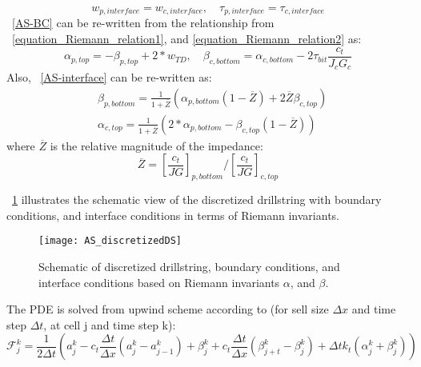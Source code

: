 \begin{equation}\label{AS-interface}
  w_{p,interface} = w_{c,interface}, \quad \tau_{p,interface} = \tau_{c,interface}
\end{equation}
\equationname~\ref{AS-BC} can be re-written from the relationship from \equationname~\ref{equation_Riemann_relation1}, and \ref{equation_Riemann_relation2} as:
\begin{equation}\label{AS-riemannBC}
  \alpha_{p,top} = -\beta_{p,top} + 2*w_{TD}, \quad \beta_{c,bottom} = \alpha_{c,bottom} - 2\tau_{bit} \frac{c_t}{J_c G_c}
\end{equation}
Also, \equationname~\ref{AS-interface} can be re-written as:
\begin{equation}\label{AS-riemanninterface}
\begin{split}
    & \beta_{p,bottom} = \frac{1}{1+\overline{Z}}\left(\alpha_{p,bottom}(1-\overline{Z}) + 2\overline{Z}\beta_{c,top} \right) \\
    & \alpha_{c,top} = \frac{1}{1+\overline{Z}}\left(2*\alpha_{p,bottom} - \beta_{c,top}(1-\overline{Z})\right)
\end{split}
\end{equation}
where $\overline{Z}$ is the relative magnitude of the impedance:
\begin{equation}\label{AS_Zbar}
  \overline{Z} = \left[\frac{c_t}{JG}\right]_{p,bottom} / \left[\frac{c_t}{JG}\right]_{c,top}
\end{equation}

\figurename~\ref{AS_discretizeDS} illustrates the schematic view of the discretized drillstring with boundary conditions, and interface conditions in terms of Riemann invariants. 

\begin{figure}[!hbt]
  \centering
  \texttt{[image: AS\_discretizedDS]}
  \caption[Schematic of discretized drillstring and boundary conditions]{Schematic of discretized drillstring, boundary conditions, and interface conditions based on Riemann invariants $\alpha$, and $\beta$.}\label{AS_discretizeDS}
\end{figure}

The PDE is solved from upwind scheme according to (for sell size $\Delta x$ and time step $\Delta t$, at cell j and time step k):
\begin{equation}\label{AS-upwind}
  \mathcal{F}_{j}^k = \frac{1}{2 \Delta t}\left(a_j^k - c_t \frac{\Delta t}{\Delta x}(a_j^k - a_{j-1}^k) + \beta_j^k + c_t \frac{\Delta t}{\Delta x}(\beta_{j+t}^k-\beta_j^k) + \Delta t k_t (\alpha_j^k + \beta_j^k)\right)
\end{equation}

